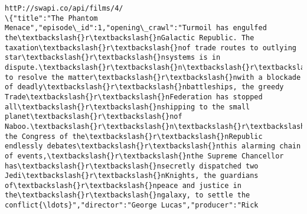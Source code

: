 \documentclass[11pt]{article}
\begin{document}
\begin{Verbatim}[commandchars=\\\{\}]
httP://swapi.co/api/films/4/
\{"title":"The Phantom Menace","episode\_id":1,"opening\_crawl":"Turmoil has engulfed the\textbackslash{}r\textbackslash{}nGalactic Republic. The taxation\textbackslash{}r\textbackslash{}nof trade routes to outlying star\textbackslash{}r\textbackslash{}nsystems is in dispute.\textbackslash{}r\textbackslash{}n\textbackslash{}r\textbackslash{}nHoping to resolve the matter\textbackslash{}r\textbackslash{}nwith a blockade of deadly\textbackslash{}r\textbackslash{}nbattleships, the greedy Trade\textbackslash{}r\textbackslash{}nFederation has stopped all\textbackslash{}r\textbackslash{}nshipping to the small planet\textbackslash{}r\textbackslash{}nof Naboo.\textbackslash{}r\textbackslash{}n\textbackslash{}r\textbackslash{}nWhile the Congress of the\textbackslash{}r\textbackslash{}nRepublic endlessly debates\textbackslash{}r\textbackslash{}nthis alarming chain of events,\textbackslash{}r\textbackslash{}nthe Supreme Chancellor has\textbackslash{}r\textbackslash{}nsecretly dispatched two Jedi\textbackslash{}r\textbackslash{}nKnights, the guardians of\textbackslash{}r\textbackslash{}npeace and justice in the\textbackslash{}r\textbackslash{}ngalaxy, to settle the conflict{\ldots}","director":"George Lucas","producer":"Rick 
\end{Verbatim}
\end{document}
